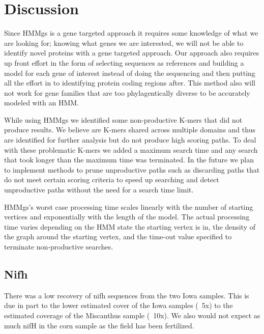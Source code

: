 \documentclass{article}
\begin{document}
\section{Discussion}
Since HMMgs is a gene targeted approach it requires some knowledge of what we are looking for; knowing what genes we are interested, we will not be able to identify novel proteins with a gene targeted approach.  Our approach also requires up front effort in the form of selecting sequences as references and building a model for each gene of interest instead of doing the sequencing and then putting all the effort in to identifying protein coding regions after.  This method also will not work for gene families that are too phylagentically diverse to be accurately modeled with an HMM.

While using HMMgs we identified some non-productive K-mers that did not produce results. We believe are K-mers shared across multiple domains and thus are identified for further analysis but do not produce high scoring paths.  To deal with these problematic K-mers we added a maximum search time and any search that took longer than the maximum time was terminated.  In the future we plan to implement methods to prune unproductive paths such as discarding paths that do not meet certain scoring criteria to speed up searching and detect unproductive paths without the need for a search time limit.

HMMgs's worst case processing time scales linearly with the number of starting vertices and exponentially with the length of the model.  The actual processing time varies depending on the HMM state the starting vertex is in, the density of the graph around the starting vertex, and the time-out value specified to terminate non-productive searches.
\subsection{Nifh}
There was a low recovery of nifh sequences from the two Iowa samples.  This is due in part to the lower estimated cover of the Iowa samples (~5x) to the estimated coverage of the Miscanthus sample (~10x).  We also would not expect as much nifH in the corn sample as the field has been fertilized.


\end{document}
